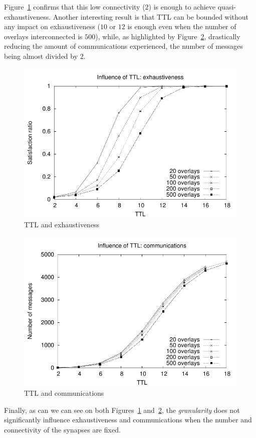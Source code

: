 Figure~\ref{fig:TTL-sat} confirms that this low connectivity ($2$) is
enough to achieve quasi-exhaustiveness. Another interesting result is
that TTL can be bounded without any impact on exhaustiveness ($10$ or
$12$ is enough even when the number of overlays interconnected is
$500$), while, as highlighted by Figure~\ref{fig:TTL-msgs}, drastically
reducing the amount of communications experienced, the number of
messages being almost divided by $2$.
%
\begin{figure}
        \includegraphics[width=\linewidth]{fig/TTL-sat.pdf}
        \caption{TTL and exhaustiveness\label{fig:TTL-sat}}
\end{figure}
%
\begin{figure}
        \includegraphics[width=\linewidth]{fig/TTL-msgs.pdf}
        \caption{TTL and communications\label{fig:TTL-msgs}}
\end{figure}
%
Finally, as can we can see on both Figures~\ref{fig:TTL-sat}
and~\ref{fig:TTL-msgs}, the \emph{granularity} does not significantly
influence exhaustiveness and communications when the number and
connectivity of the synapses are fixed.

